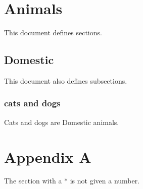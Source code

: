 \documentclass{article}
\date=06
\begin{document}
\tableofcontents
\section{Animals}
This document defines sections.
\subsection{Domestic}
This document also defines subsections.
\subsubsection{cats and dogs}
Cats and dogs are Domestic animals.
\section*{Appendix A}
The section with a * is not given a number.
\end{document}
